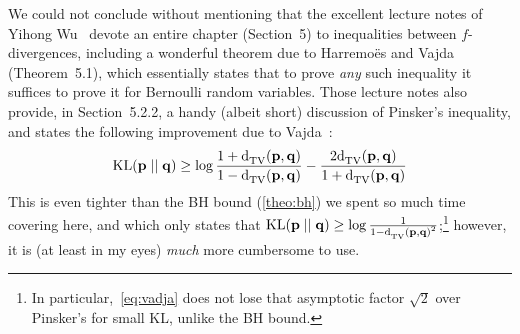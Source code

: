 \documentclass[10pt]{article}
\begin{document}
We could not conclude without mentioning that the excellent lecture notes of Yihong Wu~\cite{Wu20} devote an entire chapter (Section~5) to inequalities between $f$-divergences, including a wonderful theorem due to Harremo\"es and Vajda (Theorem~5.1), which essentially states that to prove \emph{any} such inequality it suffices to prove it for Bernoulli random variables. Those lecture notes also provide, in Section~5.2.2, a handy (albeit short) discussion of Pinsker's inequality, and states the following improvement due to Vajda~\cite{Vajda70}:
\begin{equation}
  \label{eq:vadja}
  \kldiv{\p}{\q} \geq \log\frac{1+\totalvardist{\p}{\q}}{1-\totalvardist{\p}{\q}} - \frac{2\totalvardist{\p}{\q}}{1+\totalvardist{\p}{\q}}
\end{equation}
This is even tighter than the BH bound (\autoref{theo:bh}) we spent so much time covering here, and which only states that $\kldiv{\p}{\q} \geq \log\frac{1}{1-\totalvardist{\p}{\q}^2}$;\footnote{In particular,~\eqref{eq:vadja} does not lose that asymptotic factor $\sqrt{2}$ over Pinsker's for small KL, unlike the BH bound.} however, it is (at least in my eyes) \emph{much} more cumbersome to use.
\end{document}
